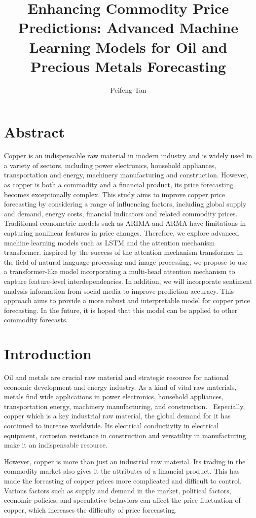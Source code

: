 \documentclass[project-plan]{report-template}
\title{Enhancing Commodity Price Predictions: Advanced Machine Learning Models for Oil and Precious Metals Forecasting}
\author{Peifeng Tan}
\begin{document}
\maketitlepage  %

\section*{Abstract}
Copper is an indispensable raw material in modern industry and is widely used in a variety of sectors, including power electronics, household appliances, transportation and energy, machinery manufacturing and construction. However, as copper is both a commodity and a financial product, its price forecasting becomes exceptionally complex. This study aims to improve copper price forecasting by considering a range of influencing factors, including global supply and demand, energy costs, financial indicators and related commodity prices. Traditional econometric models such as ARIMA and ARMA have limitations in capturing nonlinear features in price changes. Therefore, we explore advanced machine learning models such as LSTM and the attention mechanism transformer. inspired by the success of the attention mechanism transformer in the field of natural language processing and image processing, we propose to use a transformer-like model incorporating a multi-head attention mechanism to capture feature-level interdependencies. In addition, we will incorporate sentiment analysis information from social media to improve prediction accuracy. This approach aims to provide a more robust and interpretable model for copper price forecasting. In the future, it is hoped that this model can be applied to other commodity forecasts.
\section{Introduction}
Oil and metals are crucial raw material and strategic resource for national economic development and energy industry. As a kind of vital raw materials, metals find wide applications in power electronics, household appliances, transportation energy, machinery manufacturing, and construction.~\cite{zhong2019time, qu2019unfolding, han2022r} Especially, copper which is a key industrial raw material, the global demand for it has continued to increase worldwide. Its electrical conductivity in electrical equipment, corrosion resistance in construction and versatility in manufacturing make it an indispensable resource.

\noindent However, copper is more than just an industrial raw material. Its trading in the commodity market also gives it the attributes of a financial product. This has made the forcasting of copper prices more complicated and difficult to control. Various factors such as supply and demand in the market, political factors, economic policies, and speculative behaviors can affect the price fluctuation of copper, which increases the difficulty of price forecasting.
\end{document}
